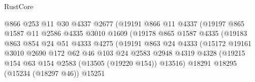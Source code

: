 \begin{lexlean}{RustCore}
\begin{coremodule}
                                @866
                                @253
                                @11
                                @30
                                @4337
                                @2677
                                (@19191
                                  @866
                                  @11
                                  @4337
                                  (@19197
                                    @865
                                    @1587
                                    @11
                                    @2586
                                    @4335
                                    @3010
                                    @1609
                                    (@19178
                                      @865
                                      @1587
                                      @4335
                                      (@19183
                                        @863
                                        @854
                                        @24
                                        @51
                                        @4333
                                        @4275
                                        (@19191
                                          @863
                                          @24
                                          @4333
                                          (@15172
                                            @19161
                                            @3010
                                            @2690
                                            @172
                                            @62
                                            @46
                                            @103
                                            @24
                                            @2583
                                            @2948
                                            @4319
                                            @4328
                                            (@19215
                                              @154
                                              @63
                                              @154
                                              @2583
                                              (@13505 (@19220 @154))
                                              @13516)
                                            @18291
                                            @18295
                                            (@15234 (@18297 @46))
                                            @15251

\end{coremodule}
\end{lexlean}
